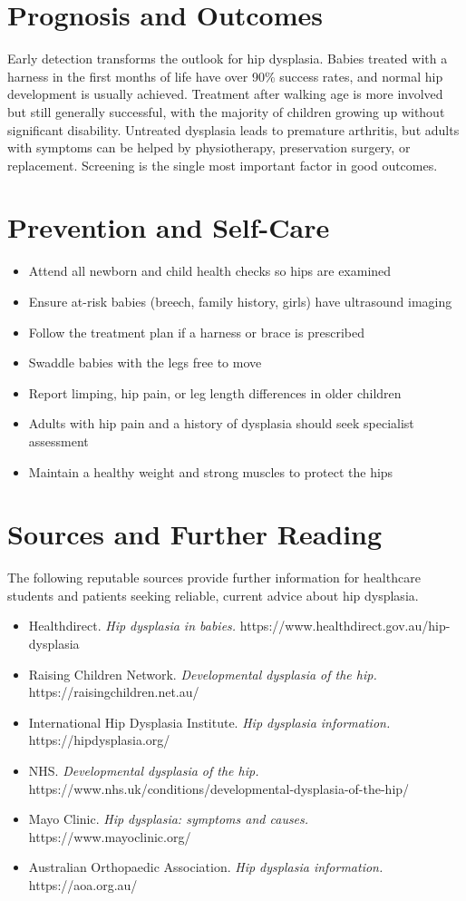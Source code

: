 \section*{Prognosis and Outcomes}
Early detection transforms the outlook for hip dysplasia. Babies treated with a harness in the first months of life have over 90\% success rates, and normal hip development is usually achieved. Treatment after walking age is more involved but still generally successful, with the majority of children growing up without significant disability. Untreated dysplasia leads to premature arthritis, but adults with symptoms can be helped by physiotherapy, preservation surgery, or replacement. Screening is the single most important factor in good outcomes.

\section*{Prevention and Self-Care}
\begin{itemize}
    \item Attend all newborn and child health checks so hips are examined
    \item Ensure at-risk babies (breech, family history, girls) have ultrasound imaging
    \item Follow the treatment plan if a harness or brace is prescribed
    \item Swaddle babies with the legs free to move
    \item Report limping, hip pain, or leg length differences in older children
    \item Adults with hip pain and a history of dysplasia should seek specialist assessment
    \item Maintain a healthy weight and strong muscles to protect the hips
\end{itemize}

\section*{Sources and Further Reading}
The following reputable sources provide further information for healthcare students and patients seeking reliable, current advice about hip dysplasia.

\begin{itemize}
    \item Healthdirect. \textit{Hip dysplasia in babies.} https://www.healthdirect.gov.au/hip-dysplasia
    \item Raising Children Network. \textit{Developmental dysplasia of the hip.} https://raisingchildren.net.au/
    \item International Hip Dysplasia Institute. \textit{Hip dysplasia information.} https://hipdysplasia.org/
    \item NHS. \textit{Developmental dysplasia of the hip.} https://www.nhs.uk/conditions/developmental-dysplasia-of-the-hip/
    \item Mayo Clinic. \textit{Hip dysplasia: symptoms and causes.} https://www.mayoclinic.org/
    \item Australian Orthopaedic Association. \textit{Hip dysplasia information.} https://aoa.org.au/
\end{itemize}
